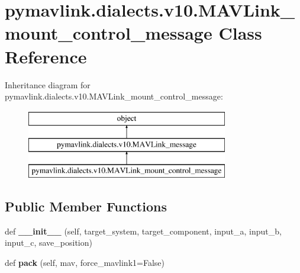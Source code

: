\hypertarget{classpymavlink_1_1dialects_1_1v10_1_1MAVLink__mount__control__message}{}\section{pymavlink.\+dialects.\+v10.\+M\+A\+V\+Link\+\_\+mount\+\_\+control\+\_\+message Class Reference}
\label{classpymavlink_1_1dialects_1_1v10_1_1MAVLink__mount__control__message}
Inheritance diagram for pymavlink.\+dialects.\+v10.\+M\+A\+V\+Link\+\_\+mount\+\_\+control\+\_\+message\+:\begin{figure}[H]
\begin{center}
\leavevmode
\includegraphics[height=3.000000cm]{classpymavlink_1_1dialects_1_1v10_1_1MAVLink__mount__control__message}
\end{center}
\end{figure}
\subsection*{Public Member Functions}
\begin{DoxyCompactItemize}
\item 
\mbox{\label{classpymavlink_1_1dialects_1_1v10_1_1MAVLink__mount__control__message_acab22348a68bfac60691d49122f48805}} 
def {\bfseries \+\_\+\+\_\+init\+\_\+\+\_\+} (self, target\+\_\+system, target\+\_\+component, input\+\_\+a, input\+\_\+b, input\+\_\+c, save\+\_\+position)
\item 
\mbox{\label{classpymavlink_1_1dialects_1_1v10_1_1MAVLink__mount__control__message_a05774238ed9891cb9f44a84e726c2580}} 
def {\bfseries pack} (self, mav, force\+\_\+mavlink1=False)
\end{DoxyCompactItemize}
